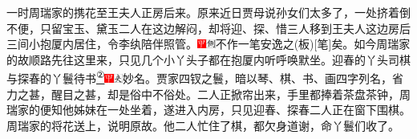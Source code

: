 一时周瑞家的携花至王夫人正房后来。原来近日贾母说孙女们太多了，一处挤着倒不便，只留宝玉、黛玉二人在这边解闷，却将迎、探、惜三人移到王夫人这边房后三间小抱厦内居住，令李纨陪伴照管。{{\includegraphics[width=3mm]{../Images/00002}\includegraphics[width=3mm]{../Images/00011}\footnotesize \kaishu 不作一笔安逸之{(板)}{[}笔{]}矣。}}如今周瑞家的故顺路先往这里来，只见几个小丫头子都在抱厦内听呼唤默坐。迎春的丫头司棋与探春的丫鬟待书\href{../Text/part0011_split_000.html\#lnkback_2_a}{\textsuperscript{②}}{\includegraphics[width=3mm]{../Images/00002}\includegraphics[width=3mm]{../Images/00012}\footnotesize \kaishu 妙名。贾家四钗之鬟，暗以琴、棋、书、画四字列名，省力之甚，醒目之甚，却是俗中不俗处。}二人正掀帘出来，手里都捧着茶盘茶钟，周瑞家的便知他姊妹在一处坐着，遂进入内房，只见迎春、探春二人正在窗下围棋。周瑞家的将花送上，说明原故。他二人忙住了棋，都欠身道谢，命丫鬟们收了。

